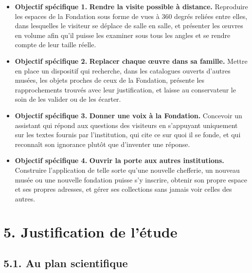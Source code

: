 \begin{itemize}[label={},leftmargin=0pt,itemsep=5pt,topsep=4pt,parsep=0pt]
  \item \textbf{Objectif spécifique 1.} \textbf{Rendre la visite possible à distance.} Reproduire
        les espaces de la Fondation sous forme de vues à 360 degrés reliées
        entre elles, dans lesquelles le visiteur se déplace de salle en salle,
        et présenter les œuvres en volume afin qu'il puisse les examiner sous
        tous les angles et se rendre compte de leur taille réelle.

  \item \textbf{Objectif spécifique 2.} \textbf{Replacer chaque œuvre dans sa famille.} Mettre en
        place un dispositif qui recherche, dans les catalogues ouverts d'autres
        musées, les objets proches de ceux de la Fondation, présente les
        rapprochements trouvés avec leur justification, et laisse au
        conservateur le soin de les valider ou de les écarter.

  \item \textbf{Objectif spécifique 3.} \textbf{Donner une voix à la Fondation.} Concevoir un
        assistant qui répond aux questions des visiteurs en s'appuyant
        uniquement sur les textes fournis par l'institution, qui cite ce sur
        quoi il se fonde, et qui reconnaît son ignorance plutôt que d'inventer
        une réponse.

  \item \textbf{Objectif spécifique 4.} \textbf{Ouvrir la porte aux autres institutions.}
        Construire l'application de telle sorte qu'une nouvelle chefferie, un
        nouveau musée ou une nouvelle fondation puisse s'y inscrire, obtenir son
        propre espace et ses propres adresses, et gérer ses collections sans
        jamais voir celles des autres.
\end{itemize}

\section*{5. Justification de l'étude}

\subsection*{5.1. Au plan scientifique}

